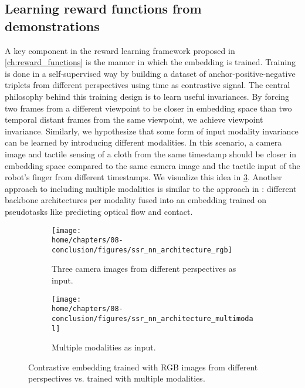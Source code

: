 \documentclass[\home/main.tex]{subfiles}
\begin{document}
\subsection{Learning reward functions from demonstrations}
A key component in the reward learning framework proposed in \cref{ch:reward_functions} is the manner in which the embedding is trained. Training is done in a self-supervised way by building a dataset of anchor-positive-negative triplets from different perspectives using time as contrastive signal. The central philosophy behind this training design is to learn useful invariances. By forcing two frames from a different viewpoint to be closer in embedding space than two temporal distant frames from the same viewpoint, we achieve viewpoint invariance. Similarly, we hypothesize that some form of input modality invariance can be learned by introducing different modalities. In this scenario, a camera image and tactile sensing of a cloth from the same timestamp should be closer in embedding space compared to the same camera image and the tactile input of the robot's finger from different timestamps. We visualize this idea in \cref{fig:conc_multimodal_tcn}. %
Another approach to including multiple modalities is similar to the approach in \autocite{Lee2019}: different backbone architectures per modality fused into an embedding trained on pseudotasks like predicting optical flow and contact.

\begin{figure}[htpb]{}
    \centering
    \begin{subfigure}[b]{0.90\textwidth}
        \centering
        \texttt{[image: \\home/chapters/08-conclusion/figures/ssr\_nn\_architecture\_rgb]}
        \caption{Three camera images from different perspectives as input.}
        \label{fig:conc_tcn_rgb}
    \end{subfigure}
    \par\bigskip %
    \begin{subfigure}[b]{0.90\textwidth}
        \centering
        \texttt{[image: \\home/chapters/08-conclusion/figures/ssr\_nn\_architecture\_multimodal]}
        \caption{Multiple modalities as input.}
        \label{fig:conc_tcn_multimodal}
    \end{subfigure}

    \caption[]{Contrastive embedding trained with RGB images from different perspectives vs. trained with multiple modalities.}
    \label{fig:conc_multimodal_tcn}
\end{figure}
\end{document}
